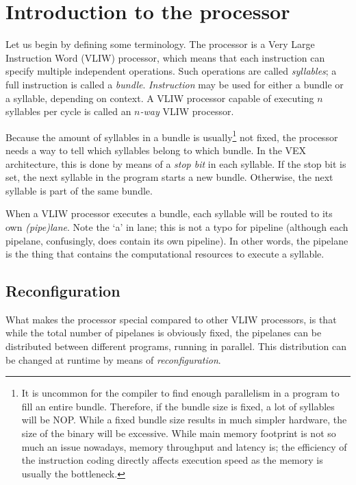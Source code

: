 
\clearpage
\section{Introduction to the \rvex{} processor}
\label{sec:core-ug-intro}

Let us begin by defining some terminology. The \rvex{} processor is a Very Large 
Instruction Word (VLIW) processor, which means that each instruction can specify 
multiple independent operations. Such operations are called \textit{syllables}; 
a full instruction is called a \textit{bundle}. \textit{Instruction} may be used 
for either a bundle or a syllable, depending on context. A VLIW processor 
capable of executing $n$ syllables per cycle is called an $n$\textit{-way} VLIW 
processor.

Because the amount of syllables in a bundle is usually\footnote{It is uncommon 
for the compiler to find enough parallelism in a program to fill an entire 
bundle. Therefore, if the bundle size is fixed, a lot of syllables will be NOP. 
While a fixed bundle size results in much simpler hardware, the size of the 
binary will be excessive. While main memory footprint is not so much an issue 
nowadays, memory throughput and latency is; the efficiency of the instruction 
coding directly affects execution speed as the memory is usually the 
bottleneck.} not fixed, the processor needs a way to tell which syllables belong 
to which bundle. In the VEX architecture, this is done by means of a 
\textit{stop bit} in each syllable. If the stop bit is set, the next syllable in 
the program starts a new bundle. Otherwise, the next syllable is part of the 
same bundle.

When a VLIW processor executes a bundle, each syllable will be routed to its own 
\textit{(pipe)lane}. Note the `a' in lane; this is not a typo for pipeline 
(although each pipelane, confusingly, does contain its own pipeline). In other 
words, the pipelane is the thing that contains the computational resources to 
execute a syllable.

\subsection{Reconfiguration}
\label{sec:core-ug-intro-reconf}

What makes the \rvex{} processor special compared to other VLIW processors, is 
that while the total number of pipelanes is obviously fixed, the pipelanes can 
be distributed between different programs, running in parallel. This 
distribution can be changed at runtime by means of \textit{reconfiguration}.

